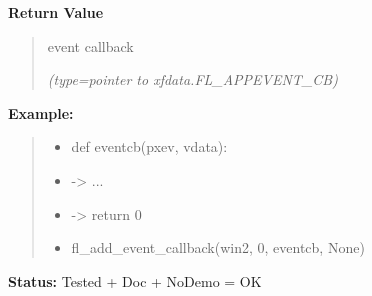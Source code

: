 \begin{boxedminipage}{\funcwidth}
      \textbf{Return Value}
    \vspace{-1ex}

      \begin{quote}
      event callback

      {\it (type=pointer to xfdata.FL\_APPEVENT\_CB)}

      \end{quote}

\textbf{Example:}
\begin{quote}
  \begin{itemize}

  \item
    \setlength{\parskip}{0.6ex}
def eventcb(pxev, vdata):



  \item {\textbar}-{\textgreater}{\textbar}  ...



  \item {\textbar}-{\textgreater}{\textbar} return 0



  \item fl\_add\_event\_callback(win2, 0, eventcb, None)



\end{itemize}

\end{quote}

\textbf{Status:} Tested + Doc + NoDemo = OK



    \end{boxedminipage}

    \label{xformslib:flxbasic:fl_remove_event_callback}

    \vspace{0.5ex}

